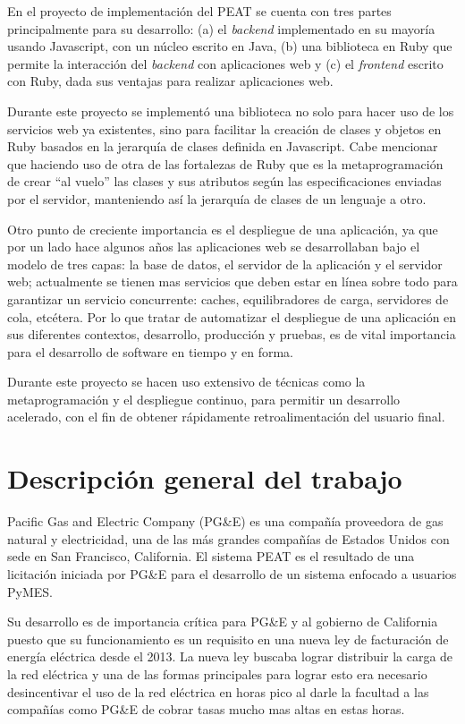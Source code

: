 \documentclass{article}
\begin{document}
En el proyecto de implementación del PEAT se cuenta con tres partes principalmente para su desarrollo: (a) el \textit{backend}  implementado en su mayoría usando Javascript, con un núcleo escrito en Java, (b) una biblioteca en Ruby que permite la interacción del \textit{backend} con aplicaciones web y (c) el \textit{frontend} escrito con Ruby, dada sus ventajas para realizar aplicaciones web.

Durante este proyecto se implementó una biblioteca no solo para hacer uso de
los servicios web ya existentes, sino para facilitar la creación
de clases y objetos en Ruby basados en la jerarquía de clases definida
en Javascript. Cabe mencionar que haciendo uso de otra de las fortalezas de Ruby
que es la metaprogramación de crear ``al vuelo'' las clases y sus atributos
según las especificaciones enviadas por el servidor, manteniendo así la
jerarquía de clases de un lenguaje a otro.

Otro punto de creciente importancia es el despliegue de una aplicación, ya que por un
lado hace algunos años las aplicaciones web se desarrollaban bajo el modelo de
tres capas: la base de datos, el servidor de la aplicación y el servidor web; actualmente se tienen mas servicios
que deben estar en línea sobre todo para garantizar un servicio concurrente:
caches, equilibradores de carga, servidores de cola, etcétera. Por lo que tratar
de automatizar el despliegue de una aplicación en sus diferentes contextos,
desarrollo, producción y pruebas, es de vital importancia para el desarrollo
de software en tiempo y en forma.

Durante este proyecto se hacen uso extensivo de técnicas como la metaprogramación
y el despliegue continuo, para permitir un desarrollo acelerado, con el fin de
obtener rápidamente retroalimentación del usuario final.

\section{Descripción general del trabajo}
Pacific Gas and Electric Company (PG\&E) es una compañía proveedora de gas natural
y electricidad, una de las más grandes compañías de Estados Unidos con sede en
San Francisco, California. El sistema PEAT es el resultado de una licitación
iniciada por PG\&E para el desarrollo de un sistema enfocado a usuarios PyMES.

Su desarrollo es de importancia crítica para PG\&E y al gobierno de
California puesto que su funcionamiento es un requisito en una nueva
ley de facturación de energía eléctrica desde el 2013. La nueva ley buscaba
lograr distribuir la carga de la red eléctrica y una de las formas
principales para lograr esto era necesario desincentivar el uso de la red
eléctrica en horas pico al darle la facultad a las compañías como PG\&E
de cobrar tasas mucho mas altas en estas horas.
\end{document}
